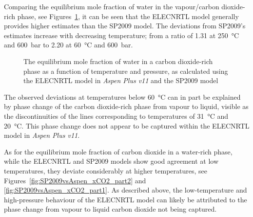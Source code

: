     Comparing the equilibrium mole fraction of water in the vapour/carbon dioxide-rich phase, see Figures~\ref{fig:SP2009vsAspen_yH2O}, it can be seen that the ELECNRTL model generally provides higher estimates than the \ac{SP2009} model. The deviations from \ac{SP2009}'s estimates increase with decreasing temperature; from a ratio of \num{1.31} at \qty{250}{\degreeCelsius} and \qty{600}{\bar} to \num{2.20} at \qty{60}{\degreeCelsius} and \qty{600}{\bar}.
    
    \begin{figure}[H]
        \centering
                 
        \caption[Comparison of the equilibrium mole fraction of water in a carbon dioxide-rich phase predictions.]{The equilibrium mole fraction of water in a carbon dioxide-rich phase as a function of temperature and pressure, as calculated using the ELECNRTL model in \emph{Aspen Plus v11} and the \ac{SP2009} model}
        \label{fig:SP2009vsAspen_yH2O}
    \end{figure}

    The observed deviations at temperatures below \qty{60}{\degreeCelsius} can in part be explained by phase change of the carbon dioxide-rich phase from vapour to liquid, visible as the discontinuities of the lines corresponding to temperatures of \qty{31}{\degreeCelsius} and \qty{20}{\degreeCelsius}. This phase change does not appear to be captured within the ELECNRTL model in \emph{Aspen Plus v11}. 
    

    As for the equilibrium mole fraction of carbon dioxide in a water-rich phase, while the ELECNRTL and \ac{SP2009} models show good agreement at low temperatures, they deviate considerably at higher temperatures, see Figures~\ref{fig:SP2009vsAspen_xCO2_part2} and \ref{fig:SP2009vsAspen_xCO2_part1}. As described above, the low-temperature and high-pressure behaviour of the ELECNRTL model can likely be attributed to the phase change from vapour to liquid carbon dioxide not being captured.
    
